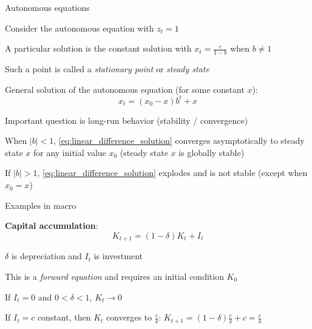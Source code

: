 \documentclass[11pt, aspectratio=169]{beamer}
\newenvironment{witemize}{\itemize\addtolength{\itemsep}{10pt}}{\enditemize}
\begin{document}
\begin{frame}{Autonomous equations}
\begin{witemize}
\item Consider the autonomous equation with $z_t = 1$ 

\item A particular solution is the constant solution with $x_t = \frac{c}{1-b}$ when $b \neq 1$

\item Such a point is called a \textit{stationary point} or \textit{steady state}

\item General solution of the autonomous equation (for some constant $x$):
\begin{equation}\label{eq:linear_difference_solution}
	x_t = (x_0 - x) b^t + x
\end{equation}

\item Important question is long-run behavior (stability / convergence)

\item When $| b | < 1$, \eqref{eq:linear_difference_solution} converges asymptotically to steady state $x$ for any initial value $x_0$ (steady state $x$ is globally stable) 

\item If $| b | > 1$, \eqref{eq:linear_difference_solution} explodes and is not stable (except when $x_0 = x$)
\end{witemize}
\end{frame}



\begin{frame}{Examples in macro}

\textbf{Capital accumulation}:
\begin{equation*}
	K_{t+1} = (1 - \delta) K_t + I_t
\end{equation*}
\begin{witemize}
\item $\delta$ is depreciation and $I_t$ is investment

\item This is a \textit{forward equation} and requires an initial condition $K_0$

\item If $I_t = 0$ and $0 < \delta < 1$, $K_t \to 0$

\item If $I_t = c$ constant, then $K_t$ converges to $\frac{c}{\delta}$: $K_{t+1} = (1-\delta) \frac{c}{\delta} + c = \frac{c}{\delta}$
\end{witemize}
\end{frame}
\end{document}
